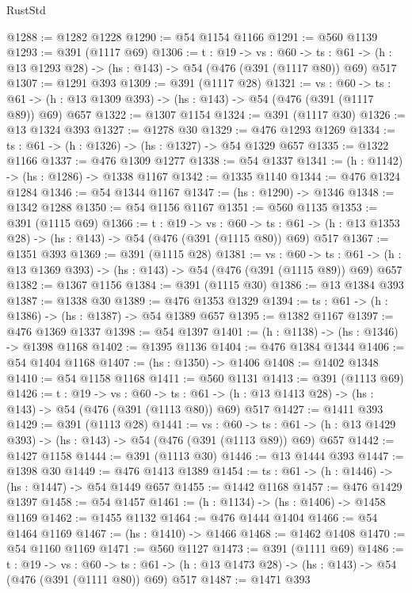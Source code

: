 \begin{lexlean}{RustStd}
\begin{coremodule}
@1288 := @1282 @1228
@1290 := @54 @1154 @1166
@1291 := @560 @1139
@1293 := @391 (@1117 @69)
@1306 := {t : @19} ->
  {vs : @60} ->
  {ts : @61} -> (h : @13 @1293 @28) -> (hs : @143) -> @54 (@476 (@391 (@1117 @80)) @69) @517
@1307 := @1291 @393
@1309 := @391 (@1117 @28)
@1321 := {vs : @60} ->
  {ts : @61} -> (h : @13 @1309 @393) -> (hs : @143) -> @54 (@476 (@391 (@1117 @89)) @69) @657
@1322 := @1307 @1154
@1324 := @391 (@1117 @30)
@1326 := @13 @1324 @393
@1327 := @1278 @30
@1329 := @476 @1293 @1269
@1334 := {ts : @61} -> (h : @1326) -> (hs : @1327) -> @54 @1329 @657
@1335 := @1322 @1166
@1337 := @476 @1309 @1277
@1338 := @54 @1337
@1341 := (h : @1142) -> (hs : @1286) -> @1338 @1167
@1342 := @1335 @1140
@1344 := @476 @1324 @1284
@1346 := @54 @1344 @1167
@1347 := (hs : @1290) -> @1346
@1348 := @1342 @1288
@1350 := @54 @1156 @1167
@1351 := @560 @1135
@1353 := @391 (@1115 @69)
@1366 := {t : @19} ->
  {vs : @60} ->
  {ts : @61} -> (h : @13 @1353 @28) -> (hs : @143) -> @54 (@476 (@391 (@1115 @80)) @69) @517
@1367 := @1351 @393
@1369 := @391 (@1115 @28)
@1381 := {vs : @60} ->
  {ts : @61} -> (h : @13 @1369 @393) -> (hs : @143) -> @54 (@476 (@391 (@1115 @89)) @69) @657
@1382 := @1367 @1156
@1384 := @391 (@1115 @30)
@1386 := @13 @1384 @393
@1387 := @1338 @30
@1389 := @476 @1353 @1329
@1394 := {ts : @61} -> (h : @1386) -> (hs : @1387) -> @54 @1389 @657
@1395 := @1382 @1167
@1397 := @476 @1369 @1337
@1398 := @54 @1397
@1401 := (h : @1138) -> (hs : @1346) -> @1398 @1168
@1402 := @1395 @1136
@1404 := @476 @1384 @1344
@1406 := @54 @1404 @1168
@1407 := (hs : @1350) -> @1406
@1408 := @1402 @1348
@1410 := @54 @1158 @1168
@1411 := @560 @1131
@1413 := @391 (@1113 @69)
@1426 := {t : @19} ->
  {vs : @60} ->
  {ts : @61} -> (h : @13 @1413 @28) -> (hs : @143) -> @54 (@476 (@391 (@1113 @80)) @69) @517
@1427 := @1411 @393
@1429 := @391 (@1113 @28)
@1441 := {vs : @60} ->
  {ts : @61} -> (h : @13 @1429 @393) -> (hs : @143) -> @54 (@476 (@391 (@1113 @89)) @69) @657
@1442 := @1427 @1158
@1444 := @391 (@1113 @30)
@1446 := @13 @1444 @393
@1447 := @1398 @30
@1449 := @476 @1413 @1389
@1454 := {ts : @61} -> (h : @1446) -> (hs : @1447) -> @54 @1449 @657
@1455 := @1442 @1168
@1457 := @476 @1429 @1397
@1458 := @54 @1457
@1461 := (h : @1134) -> (hs : @1406) -> @1458 @1169
@1462 := @1455 @1132
@1464 := @476 @1444 @1404
@1466 := @54 @1464 @1169
@1467 := (hs : @1410) -> @1466
@1468 := @1462 @1408
@1470 := @54 @1160 @1169
@1471 := @560 @1127
@1473 := @391 (@1111 @69)
@1486 := {t : @19} ->
  {vs : @60} ->
  {ts : @61} -> (h : @13 @1473 @28) -> (hs : @143) -> @54 (@476 (@391 (@1111 @80)) @69) @517
@1487 := @1471 @393

\end{coremodule}
\end{lexlean}

